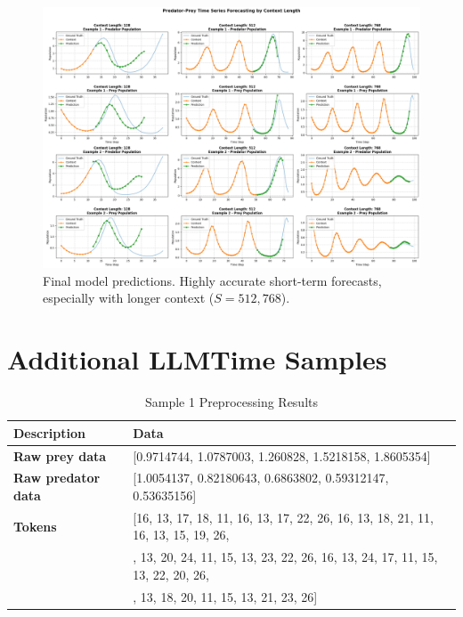 \documentclass{article}
\begin{document}
\begin{figure}[!htbp]
    \centering
    \includegraphics[width=0.8\linewidth]{M2 Course Work//Images/final_training_result.png}
    \caption{Final model predictions. Highly accurate short-term forecasts, especially with longer context ($S=512, 768$).} %
    \label{fig:final_training_predictions}
\end{figure}




\section{Additional LLMTime Samples}

\begin{table}[ht]
  \centering
  \caption{Sample 1 Preprocessing Results}
  \begin{tabular}{>{\bfseries}l l}
    \toprule
    Description & Data \\
    \midrule
    Raw prey data & [0.9714744, 1.0787003, 1.260828, 1.5218158, 1.8605354] \\
    Raw predator data & [1.0054137, 0.82180643, 0.6863802, 0.59312147, 0.53635156] \\
    Tokens  & [16, 13, 17, 18, 11, 16, 13, 17, 22, 26, 16, 13, 18, 21, 11, 16, 13, 15, 19, 26,\\ 
                & \quad 16, 13, 20, 24, 11, 15, 13, 23, 22, 26, 16, 13, 24, 17, 11, 15, 13, 22, 20, 26,\\
                & \quad 17, 13, 18, 20, 11, 15, 13, 21, 23, 26] \\
    \bottomrule
  \end{tabular}
\end{table}
\end{document}

